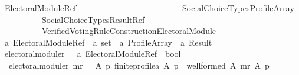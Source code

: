 %
\begin{isabellebody}%
%
%
\isadelimtheory
%
\endisadelimtheory
%
\isatagtheory
{}\isamarkupfalse%
\ Electoral{\isacharunderscore}{\kern0pt}Module{\isacharunderscore}{\kern0pt}Ref\ \ \ \ \ \ \ \ \ \ \ \ \ \ \ \ \ \ \ \ \ \ \isanewline
\ \ \ {\isachardoublequoteopen}Social{\isacharunderscore}{\kern0pt}Choice{\isacharunderscore}{\kern0pt}Types{\isacharslash}{\kern0pt}Profile{\isacharunderscore}{\kern0pt}Array{\isachardoublequoteclose}\isanewline
\ \ \ \ \ \ \ \ \ \ {\isachardoublequoteopen}Social{\isacharunderscore}{\kern0pt}Choice{\isacharunderscore}{\kern0pt}Types{\isacharslash}{\kern0pt}Result{\isacharunderscore}{\kern0pt}Ref{\isachardoublequoteclose}\isanewline
\ \ \ \ \ \ \ \ \ \ {\isachardoublequoteopen}Verified{\isacharunderscore}{\kern0pt}Voting{\isacharunderscore}{\kern0pt}Rule{\isacharunderscore}{\kern0pt}Construction{\isachardot}{\kern0pt}Electoral{\isacharunderscore}{\kern0pt}Module{\isachardoublequoteclose}\isanewline
{}%
\endisatagtheory
{\isafoldtheory}%
%
\isadelimtheory
\isanewline
%
\endisadelimtheory
\isanewline
{}\isamarkupfalse%
\ {\isacharprime}{\kern0pt}a\ Electoral{\isacharunderscore}{\kern0pt}Module{\isacharunderscore}{\kern0pt}Ref\ {\isacharequal}{\kern0pt}\ {\isachardoublequoteopen}{\isacharprime}{\kern0pt}a\ set\ {\isasymRightarrow}\ {\isacharprime}{\kern0pt}a\ Profile{\isacharunderscore}{\kern0pt}Array\ {\isasymRightarrow}\ {\isacharprime}{\kern0pt}a\ Result{\isachardoublequoteclose}\isanewline
\isanewline
{}\isamarkupfalse%
\ electoral{\isacharunderscore}{\kern0pt}module{\isacharunderscore}{\kern0pt}r\ {\isacharcolon}{\kern0pt}{\isacharcolon}{\kern0pt}\ {\isachardoublequoteopen}\ {\isacharprime}{\kern0pt}a\ Electoral{\isacharunderscore}{\kern0pt}Module{\isacharunderscore}{\kern0pt}Ref\ {\isasymRightarrow}\ bool{\isachardoublequoteclose}\ \isanewline
\ \ {\isachardoublequoteopen}electoral{\isacharunderscore}{\kern0pt}module{\isacharunderscore}{\kern0pt}r\ mr\ {\isasymequiv}\ {\isasymforall}\ A\ p{\isachardot}{\kern0pt}\ finite{\isacharunderscore}{\kern0pt}profile{\isacharunderscore}{\kern0pt}a\ A\ p\ {\isasymlongrightarrow}\ well{\isacharunderscore}{\kern0pt}formed\ A\ {\isacharparenleft}{\kern0pt}mr\ A\ p{\isacharparenright}{\kern0pt}{\isachardoublequoteclose}\isanewline
\isanewline
\isanewline
\isanewline
\isanewline
\isanewline
\isanewline
%
\isadelimtheory
\isanewline
%
\endisadelimtheory
%
\isatagtheory
{}\isamarkupfalse%
%
\endisatagtheory
{\isafoldtheory}%
%
\isadelimtheory
%
\endisadelimtheory
%
\end{isabellebody}%
\endinput
